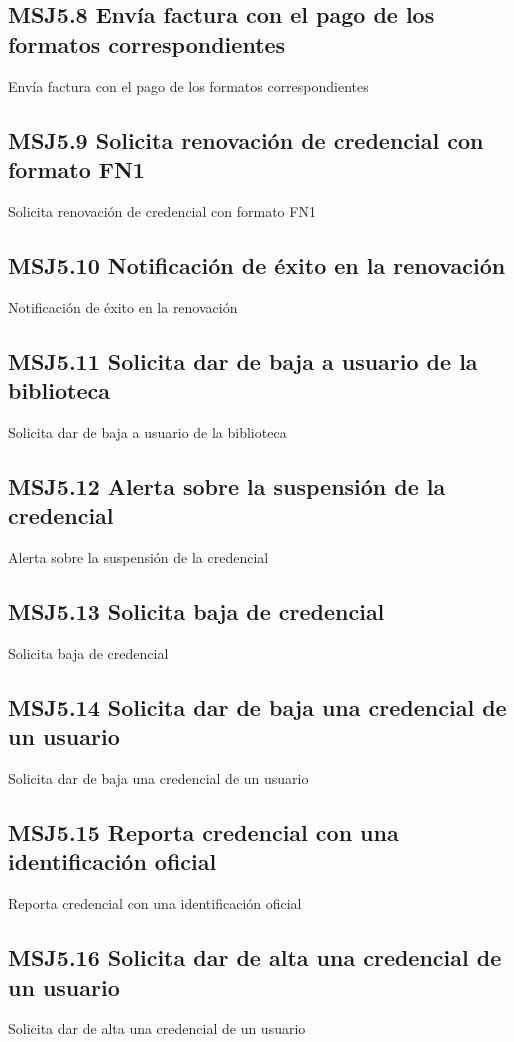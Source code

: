   \subsection{MSJ5.8 Envía factura con el pago de los formatos correspondientes }
  \noindent Envía factura con el pago de los formatos correspondientes
  
  \subsection{MSJ5.9 Solicita renovación de credencial con formato FN1 }
  \noindent Solicita renovación de credencial con formato FN1
  
  \subsection{MSJ5.10 Notificación de éxito en la renovación }
  \noindent Notificación de éxito en la renovación
  
  \subsection{MSJ5.11 Solicita dar de baja a usuario de la biblioteca }
  \noindent Solicita dar de baja a usuario de la biblioteca
  
  \subsection{MSJ5.12 Alerta sobre la suspensión de la credencial }
  \noindent Alerta sobre la suspensión de la credencial
  
  \subsection{MSJ5.13 Solicita baja de credencial }
  \noindent Solicita baja de credencial
  
  \subsection{MSJ5.14 Solicita dar de baja una credencial de un usuario }
  \noindent Solicita dar de baja una credencial de un usuario
  
  \subsection{MSJ5.15 Reporta credencial con una identificación oficial }
  \noindent Reporta credencial con una identificación oficial
  
  \subsection{MSJ5.16 Solicita dar de alta una credencial de un usuario }
  \noindent Solicita dar de alta una credencial de un usuario
